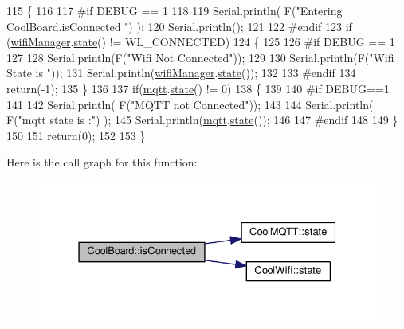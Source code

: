 \begin{DoxyCode}
115 \{
116 
117 \textcolor{preprocessor}{#if DEBUG == 1  }
118 
119     Serial.println( F(\textcolor{stringliteral}{"Entering CoolBoard.isConnected "}) );
120     Serial.println();
121 
122 \textcolor{preprocessor}{#endif}
123     \textcolor{keywordflow}{if} (\hyperlink{classCoolBoard_acd88e6003606b47479ebba81e4aceeca}{wifiManager}.\hyperlink{classCoolWifi_a1c7b4d82a4098d346e7593dce92039fa}{state}() != WL\_CONNECTED)
124     \{
125 
126 \textcolor{preprocessor}{    #if DEBUG == 1}
127     
128         Serial.println(F(\textcolor{stringliteral}{"Wifi Not Connected"}));
129 
130         Serial.println(F(\textcolor{stringliteral}{"Wifi State is "}));
131         Serial.println(\hyperlink{classCoolBoard_acd88e6003606b47479ebba81e4aceeca}{wifiManager}.\hyperlink{classCoolWifi_a1c7b4d82a4098d346e7593dce92039fa}{state}());
132         
133 \textcolor{preprocessor}{    #endif}
134         \textcolor{keywordflow}{return}(-1);
135     \}
136     
137     \textcolor{keywordflow}{if}(\hyperlink{classCoolBoard_a2399f44d7c23c1149a335cb3b46d90f1}{mqtt}.\hyperlink{classCoolMQTT_a5d003307eff78efbd585e42b43b72b6d}{state}() != 0)
138     \{
139     
140 \textcolor{preprocessor}{    #if DEBUG==1}
141         
142         Serial.println( F(\textcolor{stringliteral}{"MQTT not Connected"}));
143 
144         Serial.println( F(\textcolor{stringliteral}{"mqtt state is :"}) );
145         Serial.println(\hyperlink{classCoolBoard_a2399f44d7c23c1149a335cb3b46d90f1}{mqtt}.\hyperlink{classCoolMQTT_a5d003307eff78efbd585e42b43b72b6d}{state}());  
146     
147 \textcolor{preprocessor}{    #endif}
148 
149     \}
150     
151     \textcolor{keywordflow}{return}(0);
152 
153 \}
\end{DoxyCode}
Here is the call graph for this function\+:
\nopagebreak
\begin{figure}[H]
\begin{center}
\leavevmode
\includegraphics[width=331pt]{classCoolBoard_ad7442cf4b62c7b0d5bd62a0f75ffc065_cgraph}
\end{center}
\end{figure}
